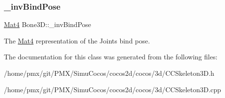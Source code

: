 \subsubsection{\texorpdfstring{\+\_\+inv\+Bind\+Pose}{\_invBindPose}}
{\footnotesize\ttfamily \hyperlink{classMat4}{Mat4} Bone3\+D\+::\+\_\+inv\+Bind\+Pose\hspace{0.3cm}{\ttfamily [protected]}}

The \hyperlink{classMat4}{Mat4} representation of the Joint\textquotesingle{}s bind pose. 

The documentation for this class was generated from the following files\+:\begin{DoxyCompactItemize}
\item 
/home/pmx/git/\+P\+M\+X/\+Simu\+Cocos/cocos2d/cocos/3d/C\+C\+Skeleton3\+D.\+h\item 
/home/pmx/git/\+P\+M\+X/\+Simu\+Cocos/cocos2d/cocos/3d/C\+C\+Skeleton3\+D.\+cpp\end{DoxyCompactItemize}
